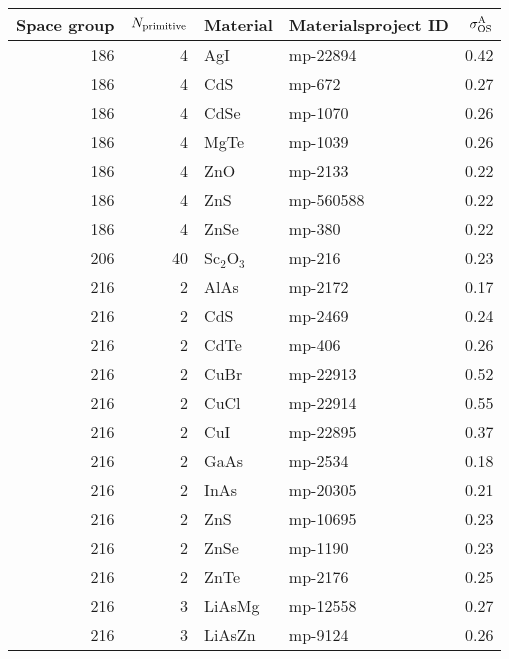 \begin{table}[t]
\small
\begin{tabular}{rrllr}
\toprule
 Space group &  $N_{\rm primitive}$  &     Material & Materialsproject ID &  $\sigma^\mathrm{A}_\mathrm{OS}$ \\
\midrule         
         186 &            4 &          AgI &   mp-22894 &       0.42 \\
         186 &            4 &          CdS &     mp-672 &       0.27 \\
         186 &            4 &         CdSe &    mp-1070 &       0.26 \\
         186 &            4 &         MgTe &    mp-1039 &       0.26 \\
         186 &            4 &          ZnO &    mp-2133 &       0.22 \\
         186 &            4 &          ZnS &  mp-560588 &       0.22 \\
         186 &            4 &         ZnSe &     mp-380 &       0.22 \\
         206 &           40 &  Sc$_2$O$_3$ &     mp-216 &       0.23 \\
         216 &            2 &         AlAs &    mp-2172 &       0.17 \\
         216 &            2 &          CdS &    mp-2469 &       0.24 \\
         216 &            2 &         CdTe &     mp-406 &       0.26 \\
         216 &            2 &         CuBr &   mp-22913 &       0.52 \\
         216 &            2 &         CuCl &   mp-22914 &       0.55 \\
         216 &            2 &          CuI &   mp-22895 &       0.37 \\
         216 &            2 &         GaAs &    mp-2534 &       0.18 \\
         216 &            2 &         InAs &   mp-20305 &       0.21 \\
         216 &            2 &          ZnS &   mp-10695 &       0.23 \\
         216 &            2 &         ZnSe &    mp-1190 &       0.23 \\
         216 &            2 &         ZnTe &    mp-2176 &       0.25 \\
         216 &            3 &       LiAsMg &   mp-12558 &       0.27 \\
         216 &            3 &       LiAsZn &    mp-9124 &       0.26 \\

\end{tabular}
\end{table}
